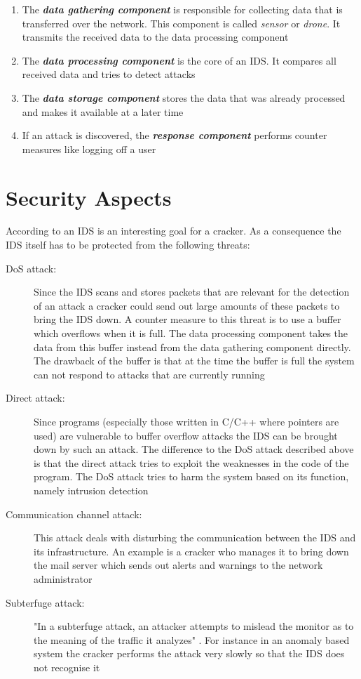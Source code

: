 \begin{enumerate}
    \item The {\bf {\em data gathering component}} is responsible for collecting data that is transferred over the network. This component is called {\em sensor} or {\em drone}. It transmits the received data to the data processing component
	\item The {\bf {\em data processing component}} is the core of an IDS. It compares all received data and tries to detect attacks
	\item The {\bf {\em data storage component}} stores the data that was already processed and makes it available at a later time
	\item If an attack is discovered, the {\bf {\em response component}} performs counter measures like logging off a user
\end{enumerate}

\section{Security Aspects}

According to \cite{wids_schreiber} an IDS is an interesting goal for a cracker. As a consequence the IDS itself has to be protected from the following threats:

\begin{description}
    \item[\ac{DoS} attack:] Since the IDS scans and stores packets that are relevant for the detection of an attack a cracker could send out large amounts of these packets to bring the IDS down. A counter measure to this threat is to use a buffer which overflows when it is full. The data processing component takes the data from this buffer instead from the data gathering component directly. The drawback of the buffer is that at the time the buffer is full the system can not respond to attacks that are currently running
    \item[Direct attack:] Since programs (especially those written in C/C++ 
where pointers are used) are vulnerable to buffer overflow attacks the IDS can be brought down by such an attack. The difference to the DoS attack described above is that the direct attack tries to exploit the weaknesses in the code of the program. The DoS attack tries to harm the system based on its function, namely intrusion detection
	\item[Communication channel attack:] This attack deals with disturbing the communication between the IDS and its infrastructure. An example is a cracker who manages it to bring down the mail server which sends out alerts and warnings to the network administrator
	\item[Subterfuge attack:] "In a subterfuge attack, an attacker attempts to mislead the monitor as to the meaning of the traffic it analyzes" \cite{subterfuge_attack}. For instance in an anomaly based system the cracker performs the attack very slowly so that the IDS does not recognise it

\end{description}



